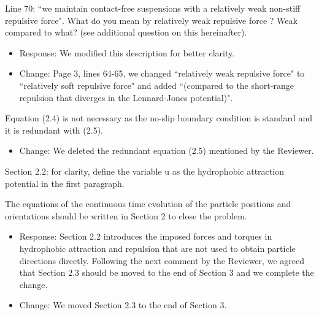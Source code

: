 \documentclass[11pt]{article}
\newcommand{\comment}[1]{{\color{blue} #1}}
\begin{document}
\noindent
\comment{Line 70: ``we maintain contact-free suspensions with a
relatively weak non-stiff repulsive force". What do you mean by
relatively weak repulsive force ? Weak compared to what? (see additional
question on this hereinafter).}
\begin{itemize}
  \item Response: We modified this description for better clarity.
  \item Change: Page 3, lines 64-65, we changed ``relatively weak repulsive force" to ``relatively soft repulsive force" and added ``(compared to the short-range repulsion that diverges in the Lennard-Jones potential)".
  
\end{itemize}

\noindent
\comment{Equation (2.4) is not necessary as the no-slip boundary
condition is standard and it is redundant with (2.5).}
\begin{itemize}
  \item Change: We deleted the redundant equation (2.5) mentioned by the Reviewer.
\end{itemize}

\noindent
\comment{Section 2.2: for clarity, define the variable u as the
hydrophobic attraction potential in the first paragraph.}

\noindent
\comment{The equations of the continuous time evolution of the particle
positions and orientations should be written in Section 2 to close the
problem.}
\begin{itemize}
  \item Response: Section 2.2 introduces the imposed forces and torques in hydrophobic attraction and repulsion that are not used to obtain particle directions directly. Following the next comment by 
the Reviewer, we agreed that Section 2.3 should be moved to the end of Section 3 and we complete the change.
\item Change: We moved Section 2.3 to the end of Section 3.
\end{itemize}
\end{document}
